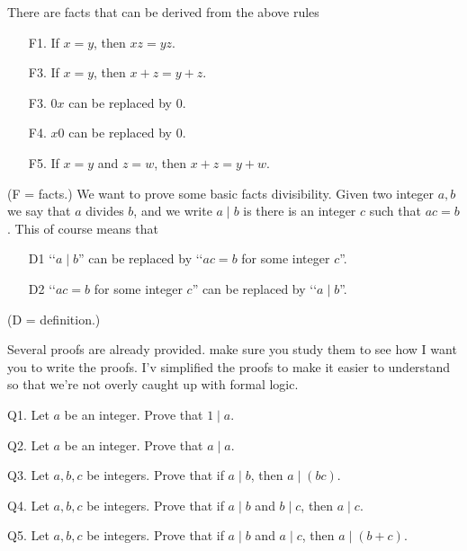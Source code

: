 There are facts that can be derived from the above rules
\begin{enumerate}
\item [F1.] If $x = y$, then $xz = yz$.
\item [F3.] If $x = y$, then $x + z = y + z$.
\item [F3.] $0x$ can be replaced by $0$.
\item [F4.] $x0$ can be replaced by $0$.
\item [F5.] If $x = y$ and $z = w$, then $x + z = y + w$.
\end{enumerate}
(F = facts.)
We want to prove some basic facts divisibility.
Given two integer $a, b$ we say that $a$ divides $b$, and we write $a \mid b$
is there is an integer $c$ such that $ac = b$.
This of course means that

\begin{enumerate}
\item [D1] \lq\lq $a \mid b$'' 
           can be replaced by \lq\lq $ac = b$ for some integer $c$''.
\item [D2] \lq\lq $ac = b$ for some integer $c$'' 
           can be replaced by \lq\lq $a \mid b$''.
\end{enumerate}
(D = definition.)

Several proofs are already provided.
make sure you study them to see how I want you to write the proofs.
I'v simplified the proofs to make it easier to understand so that
we're not overly caught up with formal logic.

\newpage

Q1. Let $a$ be an integer. Prove that $1 \mid a$.

\SOLUTION

\newpage


Q2. Let $a$ be an integer. Prove that $a \mid a$.

\SOLUTION

\newpage


Q3. Let $a,b,c$ be integers.
Prove that if $a \mid b$, then $a \mid (bc)$.

\SOLUTION

\newpage


Q4. Let $a,b,c$ be integers.
Prove that if $a \mid b$ and $b \mid c$, then $a \mid c$.

\SOLUTION

\newpage


Q5. Let $a,b,c$ be integers.
Prove that if $a \mid b$ and $a \mid c$, then $a \mid (b + c)$.

\SOLUTION

\newpage



